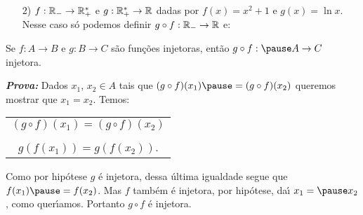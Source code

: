 \documentclass{beamer}
\begin{document}
    \begin{frame}
        \vspace{5cm}    
    \end{frame}

    \begin{frame}
        \begin{exemplos}
            \begin{enumerate}
                \item[2)] $f : \mathbb{R}_- \to \mathbb{R}^*_+$ \pause e $g : \mathbb{R}^*_+ \to \mathbb{R}$ \pause dadas por $f(x) = x^2 + 1$ \pause e $g(x) = \ln x$. \pause Nesse caso s\'o podemos definir $g \circ f : \mathbb{R}_- \to \mathbb{R}$ e:\pause
            \end{enumerate}
        \end{exemplos}

        \vspace{5cm}
    \end{frame}

    \begin{frame}
        \vspace{5cm}
    \end{frame}

    \begin{frame}
        \begin{proposicao}
            Se $f : A \to B$ \pause e $g : B \to C$ \pause s{\~a}o fun{\c c}{\~o}es injetoras, \pause ent{\~a}o $g\circ f : \pause A \to C$  injetora.\pause
        \end{proposicao}
            \noindent \textbf{\textit{Prova: }}\pause
            Dados $x_1$, \pause $x_2 \in A$ \pause tais que $(g\circ f)(x_1) \pause = (g\circ f)(x_2)$ \pause queremos mostrar que $x_1 = x_2$. \pause Temos:\pause
            \begin{center}
                \begin{tabular}{c}
                    $(g\circ f)(x_1) = (g\circ f)(x_2)$\pause\\
                    \\
                    $g(f(x_1)) = g(f(x_2))$.\pause
                \end{tabular}
            \end{center}
            Como por hip\'otese \pause $g$ \'e injetora, \pause dessa \'ultima igualdade segue \pause  que $f(x_1) \pause = f(x_2)$. \pause Mas $f$ tamb\'em \'e injetora, \pause por hip\'otese, \pause da{\'\i} $x_1 = \pause x_2$, como quer{\'\i}amos. \pause Portanto $g\circ f$ \'e injetora.\pause \hspace{.3cm} \qedsymbol
    \end{frame}
\end{document}
